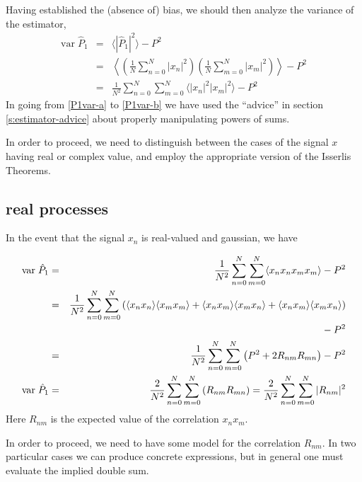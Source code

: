 Having established the (absence of) bias, we should then analyze the
variance of the estimator,
\begin{eqnarray}
\textrm{var} \;\hat{P}_1 &=& \langle |\hat{P}_1|^2 \rangle - P^2
\label{e:P1var-a} \\
&=& \left\langle \left(\frac{1}{N}\sum_{n=0}^N |x_n|^2 \right) 
  \left( \frac{1}{N}\sum_{m=0}^N |x_m|^2 \right) \right\rangle -
P^2 \label{e:P1var-b} \\
&=& \frac{1}{N^2}\sum_{n=0}^N \sum_{m=0}^N \langle|x_n|^2  |x_m|^2
\rangle - P^2
\end{eqnarray}
In going from \eqref{P1var-a} to \eqref{P1var-b} we have used the
``advice'' in section \ref{s:estimator-advice} about properly
manipulating powers of sums.

In order to proceed, we need to distinguish between the cases of the
signal $x$ having real or complex value, and employ the appropriate
version of the Isserlis Theorems.

\subsection{real processes}

In the event that the signal $x_n$ is real-valued and gaussian, we have

\begin{eqnarray}
\textrm{var} \; \hat{P}_1 &=& \frac{1}{N^2}\sum_{n=0}^N \sum_{m=0}^N
\langle x_n x_n x_m x_m \rangle - P^2 \\
&=& \frac{1}{N^2}\sum_{n=0}^N \sum_{m=0}^N \left( 
  \langle x_n x_n \rangle \langle x_m x_m \rangle +
  \langle x_n x_m \rangle \langle x_m x_n \rangle +
  \langle x_n x_m \rangle \langle x_m x_n \rangle \right) \nonumber \\
& & \rule{0.6\textwidth}{0mm} - P^2 \\
&=&\frac{1}{N^2}\sum_{n=0}^N \sum_{m=0}^N \left( 
  P^2 + 2 R_{nm}R_{mn} \right) - P^2 \\
\textrm{var} \; \hat{P}_1 &=& \frac{2}{N^2}\sum_{n=0}^N \sum_{m=0}^N 
  \left( R_{nm}R_{mn} \right) = \frac{2}{N^2}\sum_{n=0}^N \sum_{m=0}^N 
  |R_{nm}|^2 \label{e:P1var-raw}
\end{eqnarray}
Here $R_{nm}$ is the expected value of the correlation $x_n x_m$.

In order to proceed, we need to have some model for the correlation
$R_{nm}$.  In two particular cases we can produce concrete
expressions, but in general one must evaluate the implied double sum.

